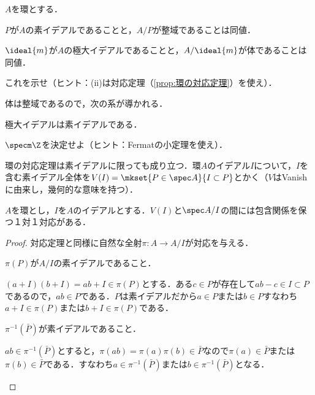 \begin{prop}
	$A$を環とする．
	\begin{sakura}
		\item $P$が$A$の素イデアルであることと，$A/P$が整域であることは同値．
		\item $\ideal{m}$が$A$の極大イデアルであることと，$A/\ideal{m}$が体であることは同値．
	\end{sakura}
\end{prop}

\begin{exer}
	これを示せ（ヒント：(ii)は対応定理（\ref{prop:環の対応定理}）を使え）．
\end{exer}

体は整域であるので，次の系が導かれる．

\begin{cor}
	極大イデアルは素イデアルである．
\end{cor}

\begin{exer}
	$\specm \Z$を決定せよ（ヒント：Fermatの小定理を使え）．
\end{exer}

環の対応定理は素イデアルに限っても成り立つ．環$A$のイデアル$I$について，$I$を含む素イデアル全体を$V(I)=\mkset{P\in\spec A}{I\subset P}$とかく（$V$はVanishに由来し，幾何的な意味を持つ）．

\begin{prop}[素イデアルの対応定理]
	$A$を環とし，$I$を$A$のイデアルとする．$V(I)$と$\spec A/I$の間には包含関係を保つ１対１対応がある．
\end{prop}
\begin{proof}
	対応定理と同様に自然な全射$\pi:A\to A/I$が対応を与える．
	\begin{step}
		\item $\pi(P)$が$A/I$の素イデアルであること．
		
		 $(a+I)(b+I)=ab+I\in\pi(P)$とする．ある$c\in P$が存在して$ab-c\in I\subset P$であるので，$ab\in P$である．$P$は素イデアルだから$a\in P$または$b\in P$すなわち$a+I\in\pi(P)$または$b+I\in\pi(P)$である．
		
		\item $\pi^{-1}(\bar{P})$が素イデアルであること．
		
		$ab\in\pi^{-1}(\bar{P})$とすると，$\pi(ab)=\pi(a)\pi(b)\in\bar{P}$なので$\pi(a)\in\bar{P}$または$\pi(b)\in\bar{P}$である．すなわち$a\in\pi^{-1}(\bar{P})$または$b\in\pi^{-1}(\bar{P})$となる．
	\end{step}
\end{proof}

